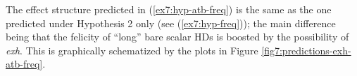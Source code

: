 \begin{exe}
	\label{ex7:hyp-atb-freq}
\end{exe}

The effect structure predicted in (\ref{ex7:hyp-atb-freq}) is the same as the one predicted under Hypothesis 2 only (see (\ref{ex7:hyp-freq})); the main difference being that the felicity of ``long'' bare scalar HDs is boosted by the possibility of \textit{exh}. This is graphically schematized by the plots in Figure \ref{fig7:predictions-exh-atb-freq}.


